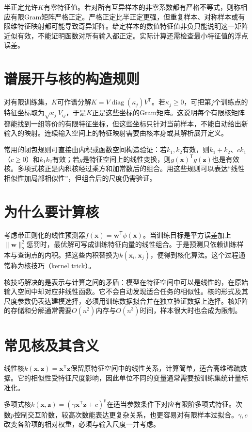 半正定允许$K$有零特征值。若对所有互异样本的非零系数都有严格不等式，则称相应有限Gram矩阵严格正定。严格正定比半正定更强，但重复样本、对称样本或有限维特征映射都可能导致奇异矩阵。给定样本的数值特征值非负只能说明这一矩阵近似有效，不能证明函数对所有输入都正定。实际计算还需检查最小特征值的浮点误差。

\section{谱展开与核的构造规则}
对有限训练集，$K$可作谱分解$K=V\operatorname{diag}(\kappa_j)V^{\mathsf T}$。若$\kappa_j\geq0$，可把第$j$个训练点的特征坐标取为$\sqrt{\kappa_j}V_{ij}$，于是$K$正是这些坐标的Gram矩阵。这说明每个有限核矩阵都能找到一组等价的有限特征坐标，但这些坐标只针对当前样本，不能自动给出新输入的映射。连续输入空间上的特征映射需要由核本身或其解析展开定义。

常用的闭包规则可直接由内积或函数空间构造验证：若$k_1,k_2$有效，则$k_1+k_2$、$c k_1$（$c\geq0$）和$k_1k_2$有效；若$g$是特征空间上的线性变换，则$g(\bm x)^{\mathsf T}g(\bm z)$也是有效核。多项式核正是内积核经过乘方和加常数后的组合。用这些规则可以表达“线性相似性加局部相似性”，但组合后的尺度仍需验证。

\section{为什么要计算核}
考虑带正则化的线性预测器$f(\bm x)=\bm w^{\mathsf T}\phi(\bm x)$。当训练目标是平方误差加上$\|\bm w\|_2^2$惩罚时，最优解可写成训练特征向量的线性组合。于是预测只依赖训练样本与查询点的内积。把这些内积替换为$k(\bm x_i,\bm x_j)$，便得到核化算法。这个过程通常称为核技巧（kernel trick）。

核技巧解决的是表示与计算之间的矛盾：模型在特征空间中可以是线性的，在原始输入空间中却对应非线性函数。它不会自动发现适合任务的相似性。核的形式及其尺度参数仍表达建模选择，必须用训练数据拟合并在独立验证数据上选择。核矩阵的存储和分解通常需要$O(n^2)$内存与$O(n^3)$时间，样本很大时也会成为限制。

\section{常见核及其含义}
线性核$k(\bm x,\bm z)=\bm x^{\mathsf T}\bm z$保留原特征空间中的线性关系，计算简单，适合高维稀疏数据。它的相似性受特征尺度影响，因此单位不同的变量通常需要按训练集统计量标准化。

多项式核$k(\bm x,\bm z)=(\gamma\bm x^{\mathsf T}\bm z+c)^p$在适当参数条件下对应有限阶多项式特征。次数$p$控制交互阶数，较高次数能表达更复杂关系，也更容易对有限样本过拟合。$\gamma,c$改变各阶项的相对权重，必须与输入尺度一并考虑。

